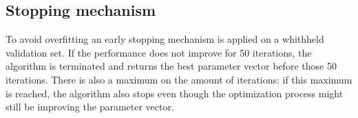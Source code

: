 \subsection{Stopping mechanism}
To avoid overfitting an early stopping mechanism is applied on a whithheld validation set. If the performance does not improve for 50 iterations, the algorithm is terminated and returns the best parameter vector before those 50 iterations.
There is also a maximum on the amount of iterations: if this maximum is reached, the algorithm also stops even though the optimization process might still be improving the parameter vector.
% 
